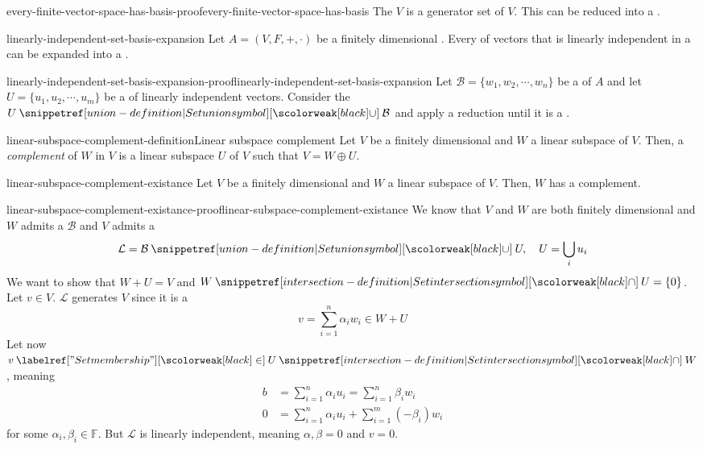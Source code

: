 \documentclass[preview]{standalone}
\begin{document}
\begin{snippetproof}{every-finite-vector-space-has-basis-proof}{every-finite-vector-space-has-basis}{}
    The \set \(V\) is a generator set of \(V\). This \set can be reduced into a \basis.
\end{snippetproof}

\begin{snippetproposition}{linearly-independent-set-basis-expansion}{}
    Let \(A=(V, F, +, \cdot)\) be a finitely dimensional \vectorspace.
    Every \set of vectors that is linearly independent
    in a \vectorspace can be expanded into a \basis.
\end{snippetproposition}

\begin{snippetproof}{linearly-independent-set-basis-expansion-proof}{linearly-independent-set-basis-expansion}{}
    Let \(\mathcal{B} = \{w_1, w_2, \cdots, w_n\}\) be a \basis of \(A\)
    and let \(U = \{u_1, u_2, \cdots, u_m\}\) be a \set of linearly independent vectors.
    Consider the \set \(U \union \mathcal{B}\) and apply a reduction until it is a \basis. 
\end{snippetproof}

\begin{snippetdefinition}{linear-subspace-complement-definition}{Linear subspace complement}
    Let \(V\) be a finitely dimensional \vectorspace and \(W\) a linear subspace of \(V\).
    Then, a \emph{complement} of \(W\) in \(V\) is a linear subspace
    \(U\) of \(V\) such that \(V = W \oplus U\).
\end{snippetdefinition}

\begin{snippetproposition}{linear-subspace-complement-existance}{}
    Let \(V\) be a finitely dimensional \vectorspace and \(W\) a linear subspace of \(V\).
    Then, \(W\) has a complement.
\end{snippetproposition}

\begin{snippetproof}{linear-subspace-complement-existance-proof}{linear-subspace-complement-existance}{}
    We know that \(V\) and \(W\) are both finitely dimensional
    and \(W\) admits a \basis \(\mathcal{B}\) and \(V\) admits a \basis
    \[
        \mathcal{L} = \mathcal{B} \union U, \quad U = \bigcup_i u_i
    \]
    We want to show that \(W+U=V\) and \(W \intersection U = \{0\}\).
    Let \(v\in V\). \(\mathcal{L}\) generates \(V\) since it is a \basis
    \[
        v = \sum_{i=1}^n \alpha_i w_i \in W + U
    \]
    Let now \(v \in U \intersection W\), meaning
    \begin{align*}
        b &= \sum_{i=1}^n \alpha_i u_i = \sum_{i=1}^n \beta_i w_i \\
        0 &= \sum_{i=1}^n \alpha_i u_i + \sum_{i=1}^m (-\beta_i)w_i
    \end{align*}
    for some \(\alpha_i, \beta_i \in \mathbb{F}\).
    But \(\mathcal{L}\) is linearly independent, meaning \(\alpha, \beta = 0\)
    and \(v=0\).
\end{snippetproof}
\end{document}
